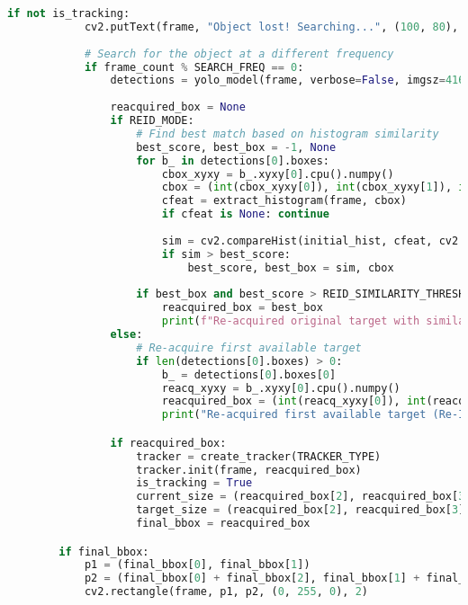 \documentclass[12pt, a4paper]{article}
\begin{document}
\begin{lstlisting}[language=Python, caption={The advanced hybrid tracking loop with re-detection.}, label={lst:hybrid_loop}]
        if not is_tracking:
            cv2.putText(frame, "Object lost! Searching...", (100, 80), cv2.FONT_HERSHEY_SIMPLEX, 0.75, (0,0,255), 2)
            
            # Search for the object at a different frequency
            if frame_count % SEARCH_FREQ == 0:
                detections = yolo_model(frame, verbose=False, imgsz=416, conf=DETECT_CONF_THRESH, classes=[target_class_id])
                
                reacquired_box = None
                if REID_MODE:
                    # Find best match based on histogram similarity
                    best_score, best_box = -1, None
                    for b_ in detections[0].boxes:
                        cbox_xyxy = b_.xyxy[0].cpu().numpy()
                        cbox = (int(cbox_xyxy[0]), int(cbox_xyxy[1]), int(cbox_xyxy[2]-cbox_xyxy[0]), int(cbox_xyxy[3]-cbox_xyxy[1]))
                        cfeat = extract_histogram(frame, cbox)
                        if cfeat is None: continue
                        
                        sim = cv2.compareHist(initial_hist, cfeat, cv2.HISTCMP_CORREL)
                        if sim > best_score:
                            best_score, best_box = sim, cbox
                    
                    if best_box and best_score > REID_SIMILARITY_THRESH:
                        reacquired_box = best_box
                        print(f"Re-acquired original target with similarity: {best_score:.2f}")
                else:
                    # Re-acquire first available target
                    if len(detections[0].boxes) > 0:
                        b_ = detections[0].boxes[0]
                        reacq_xyxy = b_.xyxy[0].cpu().numpy()
                        reacquired_box = (int(reacq_xyxy[0]), int(reacq_xyxy[1]), int(reacq_xyxy[2]-reacq_xyxy[0]), int(reacq_xyxy[3]-reacq_xyxy[1]))
                        print("Re-acquired first available target (Re-ID disabled).")

                if reacquired_box:
                    tracker = create_tracker(TRACKER_TYPE)
                    tracker.init(frame, reacquired_box)
                    is_tracking = True
                    current_size = (reacquired_box[2], reacquired_box[3])
                    target_size = (reacquired_box[2], reacquired_box[3])
                    final_bbox = reacquired_box

        if final_bbox:
            p1 = (final_bbox[0], final_bbox[1])
            p2 = (final_bbox[0] + final_bbox[2], final_bbox[1] + final_bbox[3])
            cv2.rectangle(frame, p1, p2, (0, 255, 0), 2)


\end{lstlisting}
\end{document}
